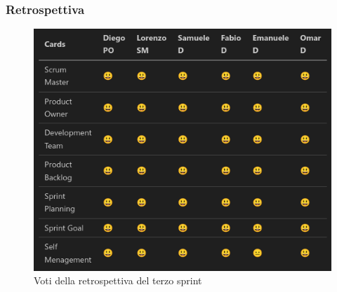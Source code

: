 \documentclass{article}
\begin{document}
\subsubsection{Retrospettiva}
\begin{figure}[H]
    \centering
    \includegraphics[width=1\textwidth]{retrospettiva3}
    \caption{Voti della retrospettiva del terzo sprint}
    \label{fig:retrospettiva3}
\end{figure}
\end{document}
